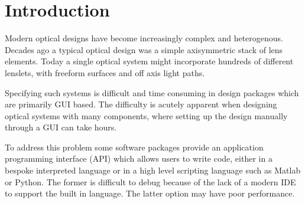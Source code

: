 \documentclass{juliacon}
\begin{document}


\maketitle

\newcommand{\OpticSim}{\textit{OpticSim.jl}}
\newcommand{\ToDo}[1]{\textcolor{red}{[#1]}}

\begin{abstract}

\OpticSim{} is an open source geometric optics ray tracing software package written in the Julia programming language.
It is designed to make the creation and analysis of complex optical systems as simple and efficient as possible.
Computations can be distributed to the cloud for large simulations tasks that would be impractical on a single multi-core computer.

Unlike closed source systems the modern modular design of \OpticSim{} allows for unlimited extensibility without the inconvenience of have to write application plug ins, or the loss of performance of typical  scripting languages.
\OpticSim{} is free to use \href{https://mit-license.org/}{(MIT license)} and open-source, available at \url{https://github.com/microsoft/OpticSim.jl}.

\end{abstract}

\section{Introduction}

Modern optical designs have become increasingly complex and heterogenous. Decades ago a typical optical design was a simple axisymmetric stack of lens elements. Today a single optical system might incorporate hundreds of different lenslets, with freeform surfaces and off axis light paths.

Specifying such systems is difficult and time consuming in design packages which are primarily GUI based. The difficulty is acutely apparent when designing optical systems with many components, where setting up the design manually through a GUI can take hours.

To address this problem some software packages provide an application programming interface (API) which allows users to write code, either in a bespoke interpreted language or in a high level scripting language such as Matlab or Python. The former is difficult to debug because of the lack of a modern IDE to support the built in language. The latter option may have poor performance.
\end{document}
